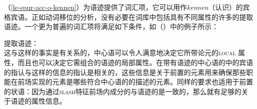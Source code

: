 （\ref{le-spur-acc-o-kennen}）为语迹提供了词汇项，它可以用作\emph{kennen}（认识）的宾格宾语。正如动词移位的分析，没有必要在词库中包括具有不同属性的许多的提取语迹。一个更为普遍的词汇项将满足如下条件，如（）中的例子所示：

\eas
\label{le-extraktionsspur}
提取语迹：\\
\zs
这与这样的事实是有关系的，中心语可以令人满意地决定它所带论元的\textsc{local} 属性，而且也可以决定它需组合的语迹的局部属性。在带有语迹\synsemv 的中心语的\subcatl 中的宾语的指认与这样的信息的指认是相关的，这些信息是关于前置的元素用来确保那些职能在前场实现的元素是哪些符合中心语的\subcatl 的描述的元素。同样的要求也适用于前置的状语：因为通过\textsc{slash}特征前场内成分的\localv 与语迹的\localv 是一致的，那么就有足够的关于语迹的属性信息。

